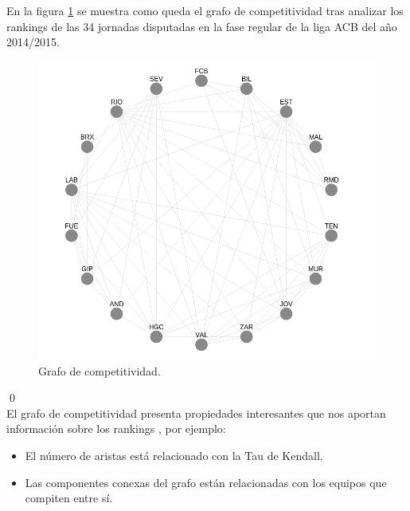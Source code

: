 \begin{ejem} En la figura \ref{fig:gcomp} se muestra como queda el grafo de competitividad tras analizar los rankings de las 34 jornadas disputadas en la fase regular de la liga ACB del año 2014/2015.
\end{ejem}	
	\begin{figure}[H]
		\centering
		\includegraphics[scale=0.57]{images/Grafo_competitividad.png}
		\caption{Grafo de competitividad.} \label{fig:gcomp}
	\end{figure}
	
\qed
\ \\
El grafo de competitividad presenta propiedades interesantes que nos aportan información sobre los rankings \cite{refcomp}, por ejemplo:
\begin{itemize}
	\item El número de aristas está relacionado con la Tau de Kendall.
	\item Las componentes conexas del grafo están relacionadas con los equipos que compiten entre sí.
\end{itemize}
